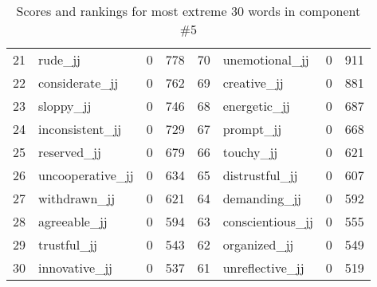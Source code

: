 \begin{table}[tbp]
\begin{tabular}{| rlr@{.}l | rlr@{.}l |}
    21 & rude\_jj & 0 & 778    &    70 & unemotional\_jj & 0 & 911 \\
    22 & considerate\_jj & 0 & 762    &    69 & creative\_jj & 0 & 881 \\
    23 & sloppy\_jj & 0 & 746    &    68 & energetic\_jj & 0 & 687 \\
    24 & inconsistent\_jj & 0 & 729    &    67 & prompt\_jj & 0 & 668 \\
    25 & reserved\_jj & 0 & 679    &    66 & touchy\_jj & 0 & 621 \\
    26 & uncooperative\_jj & 0 & 634    &    65 & distrustful\_jj & 0 & 607 \\
    27 & withdrawn\_jj & 0 & 621    &    64 & demanding\_jj & 0 & 592 \\
    28 & agreeable\_jj & 0 & 594    &    63 & conscientious\_jj & 0 & 555 \\
    29 & trustful\_jj & 0 & 543    &    62 & organized\_jj & 0 & 549 \\
    30 & innovative\_jj & 0 & 537    &    61 & unreflective\_jj & 0 & 519 \\
    \hline
    \end{tabular}
    \caption{Scores and rankings for most extreme 30 words in component \#5} 
\end{table}
\clearpage
